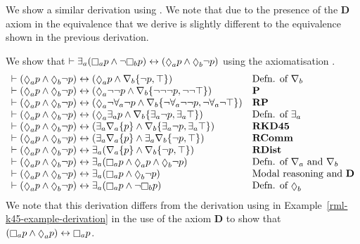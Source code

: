 \pagebreak

We show a similar derivation using \axiomRmlKD{}.
We note that due to the presence of the {\bf D} axiom in \axiomRmlKD{} the equivalence that we derive is slightly different to the equivalence shown in the previous derivation.

\begin{example}\label{rml-kd45-example-derivation}
We show that $\proves \somerefsA (\necessaryA \atomP \land \lnot \necessaryB \atomP) \iff (\possibleA \atomP \land \possibleB \lnot \atomP)$ using the axiomatisation \axiomRmlKD{}.
$$
\begin{array}{ll}
    \proves (\possibleA \atomP \land \possibleB \lnot \atomP) \iff (\possibleA \atomP \land \coversB \{\lnot \atomP, \top\}) & \text{Defn. of $\coversB$}\\
    \proves (\possibleA \atomP \land \possibleB \lnot \atomP) \iff (\possibleA \lnot \lnot \atomP \land \coversB \{\lnot \lnot \lnot \atomP, \lnot \lnot \top\}) & {\bf P}\\
    \proves (\possibleA \atomP \land \possibleB \lnot \atomP) \iff (\possibleA \lnot \allrefsA \lnot \atomP \land \coversB \{\lnot \allrefsA \lnot \lnot \atomP, \lnot \allrefsA \lnot \top\}) & {\bf RP}\\
    \proves (\possibleA \atomP \land \possibleB \lnot \atomP) \iff (\possibleA \somerefsA \atomP \land \coversB \{\somerefsA \lnot \atomP, \somerefsA \top\}) & \text{Defn. of $\somerefsA$}\\
    \proves (\possibleA \atomP \land \possibleB \lnot \atomP) \iff (\somerefsA \coversA \{\atomP\} \land \coversB \{\somerefsA \lnot \atomP, \somerefsA \top\}) & {\bf RKD45}\\
    \proves (\possibleA \atomP \land \possibleB \lnot \atomP) \iff (\somerefsA \coversA \{\atomP\} \land \somerefsA \coversB \{\lnot \atomP, \top\}) & {\bf RComm}\\
    \proves (\possibleA \atomP \land \possibleB \lnot \atomP) \iff \somerefsA (\coversA \{\atomP\} \land \coversB \{\lnot \atomP, \top\}) & {\bf RDist}\\
    \proves (\possibleA \atomP \land \possibleB \lnot \atomP) \iff \somerefsA (\necessaryA \atomP \land \possibleA \atomP \land \possibleB \lnot \atomP) & \text{Defn. of $\coversA$ and $\coversB$}\\
    \proves (\possibleA \atomP \land \possibleB \lnot \atomP) \iff \somerefsA (\necessaryA \atomP \land \possibleB \lnot \atomP) & \text{Modal reasoning and {\bf D}}\\
    \proves (\possibleA \atomP \land \possibleB \lnot \atomP) \iff \somerefsA (\necessaryA \atomP \land \lnot \necessaryB \atomP) & \text{Defn. of $\possibleB$}
\end{array}
$$
We note that this derivation differs from the derivation using \axiomRmlKFF{} in Example~\ref{rml-k45-example-derivation} in the use of the axiom {\bf D} to show that $(\necessaryA \atomP \land \possibleA \atomP) \iff \necessaryA \atomP$.
\end{example}

